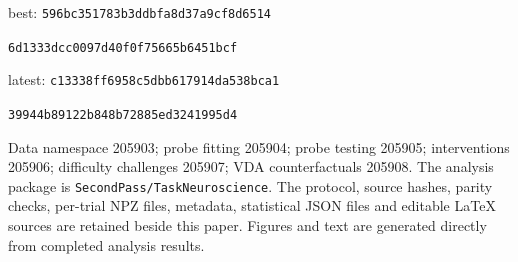 \documentclass[11pt]{article}
\begin{document}
best: \texttt{596bc351783b3ddbfa8d37a9cf8d6514}\par\texttt{6d1333dcc0097d40f0f75665b6451bcf}

latest: \texttt{c13338ff6958c5dbb617914da538bca1}\par\texttt{39944b89122b848b72885ed3241995d4}

Data namespace 205903; probe fitting 205904; probe testing 205905; interventions 205906; difficulty challenges 205907; VDA counterfactuals 205908. The analysis package is \texttt{SecondPass/TaskNeuroscience}. The protocol, source hashes, parity checks, per-trial NPZ files, metadata, statistical JSON files and editable LaTeX sources are retained beside this paper. Figures and text are generated directly from completed analysis results.
\end{document}
